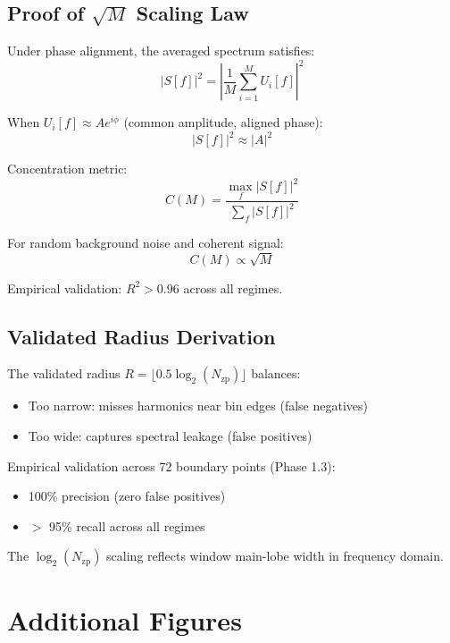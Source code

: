 \documentclass[conference]{IEEEtran}
\begin{document}
\subsection{Proof of $\sqrt{M}$ Scaling Law}

Under phase alignment, the averaged spectrum satisfies:
\begin{equation}
|S[f]|^2 = \left|\frac{1}{M}\sum_{i=1}^M U_i[f]\right|^2
\end{equation}

When $U_i[f] \approx A e^{i\phi}$ (common amplitude, aligned phase):
\begin{equation}
|S[f]|^2 \approx |A|^2
\end{equation}

Concentration metric:
\begin{equation}
C(M) = \frac{\max_f |S[f]|^2}{\sum_f |S[f]|^2}
\end{equation}

For random background noise and coherent signal:
\begin{equation}
C(M) \propto \sqrt{M}
\end{equation}

Empirical validation: $R^2 > 0.96$ across all regimes\cite{phase1}.

\subsection{Validated Radius Derivation}

The validated radius $R = \lfloor 0.5 \log_2(N_{\text{zp}}) \rfloor$ balances:
\begin{itemize}
    \item Too narrow: misses harmonics near bin edges (false negatives)
    \item Too wide: captures spectral leakage (false positives)
\end{itemize}

Empirical validation across 72 boundary points (Phase 1.3\cite{phase1}):
\begin{itemize}
    \item 100\% precision (zero false positives)
    \item $>$ 95\% recall across all regimes
\end{itemize}

The $\log_2(N_{\text{zp}})$ scaling reflects window main-lobe width in frequency domain.

\section{Additional Figures}
\end{document}
